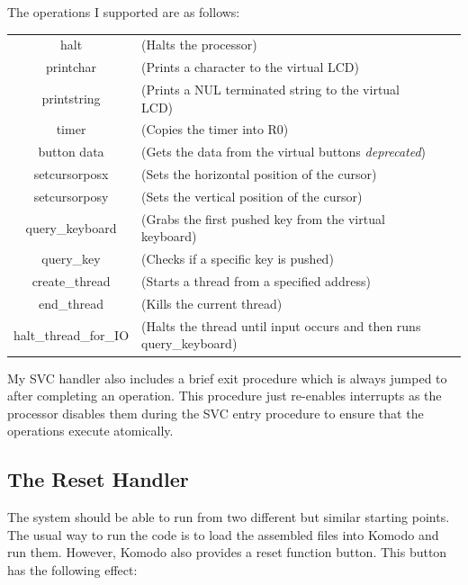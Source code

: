 The operations I supported are as follows:

\begin{tabular}{cl cl}
	halt & (Halts the processor) \\
	printchar & (Prints a character to the virtual LCD) \\
	printstring & (Prints a NUL terminated string to the virtual LCD) \\
	timer & (Copies the timer into R0) \\
	button data  & (Gets the data from the virtual buttons \textit{deprecated}) \\
	setcursorposx & (Sets the horizontal position of the cursor) \\
	setcursorposy & (Sets the vertical position of the cursor) \\
	query\_keyboard & (Grabs the first pushed key from the virtual keyboard) \\
	query\_key & (Checks if a specific key is pushed) \\
	create\_thread & (Starts a thread from a specified address) \\
	end\_thread & (Kills the current thread) \\
	halt\_thread\_for\_IO & (Halts the thread until input occurs and then runs query\_keyboard) \\
\end{tabular} 
\bigskip

My SVC handler also includes a brief exit procedure which is always jumped to after completing an operation. This procedure just re-enables interrupts as the processor disables them during the SVC entry procedure to ensure that the operations execute atomically. 
\subsection{The Reset Handler}
The system should be able to run from two different but similar starting points. The usual way to run the code is to load the assembled files into Komodo and run them. However, Komodo also provides a reset function button. This button has the following effect:

